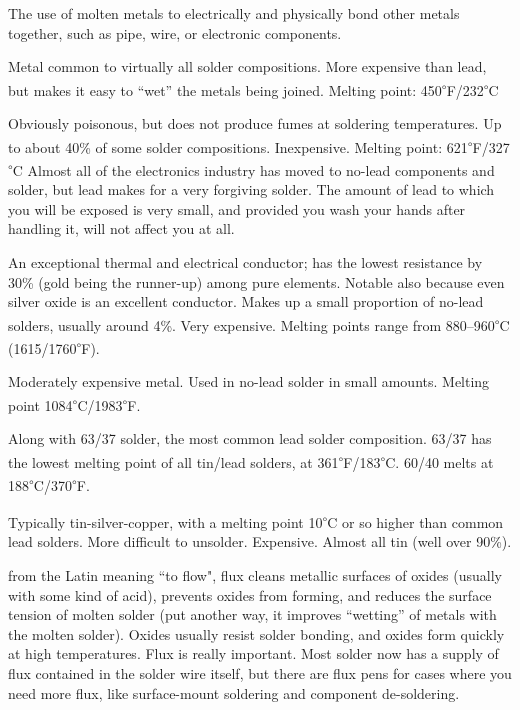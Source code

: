 \documentclass[12pt]{article}
\newcommand{\degs}[1]{\textsuperscript{$\circ$}#1}
\begin{document}
\begin{description}

\+[Soldering:] The use of molten metals to electrically and physically bond other metals together, such as pipe, wire, or electronic components.

\+[Tin:] Metal common to virtually all solder compositions. More expensive than lead, but makes it easy to ``wet'' the metals being joined. Melting point: 450\degs{F}/232\degs{C}

\+[Lead:] Obviously poisonous, but does not produce fumes at soldering temperatures. Up to about 40\% of some solder compositions. Inexpensive. Melting point: 621\degs{F}/327\degs{C} Almost all of the electronics industry has moved to no-lead components and solder, but lead makes for a very forgiving solder. The amount of lead to which you will be exposed is very small, and provided you wash your hands after handling it, will not affect you at all.

\+[Silver:] An exceptional thermal and electrical conductor; has the lowest resistance by 30\% (gold being the runner-up)  among pure elements. Notable also because even silver oxide is an excellent conductor. Makes up a small proportion of no-lead solders, usually around 4\%. Very expensive. Melting points range from 880--960\degs{C} (1615/1760\degs{F}). 

\+[Copper:] Moderately expensive metal. Used in no-lead solder in small amounts. Melting point 1084\degs{C}/1983\degs{F}. 

\+[60/40 solder:] Along with 63/37 solder, the most common lead solder composition. 63/37 has the lowest melting point of all tin/lead solders, at 361\degs{F}/183\degs{C}. 60/40 melts at 188\degs{C}/370\degs{F}. 

 Typically tin-silver-copper, with a melting point 10\degs{C} or so higher than common lead solders. More difficult to unsolder. Expensive. Almost all tin (well over 90\%).

\+[Flux:] from the Latin meaning ``to flow", flux cleans metallic surfaces of oxides (usually with some kind of acid), prevents oxides from forming, and reduces the surface tension of molten solder (put another way, it improves ``wetting'' of metals with the molten solder). Oxides usually resist solder bonding, and oxides form quickly at high temperatures. Flux is really important. Most solder now has a supply of flux contained in the solder wire itself, but there are flux pens for cases where you need more flux, like surface-mount soldering and component de-soldering.


\end{description}
\end{document}
